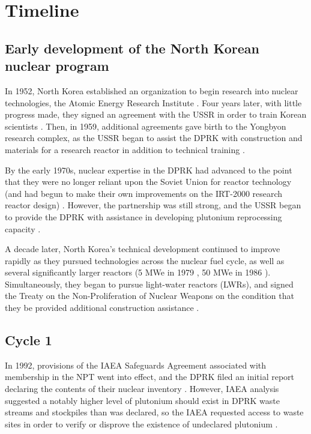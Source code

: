 \section{Timeline}
\subsection{Early development of the North Korean nuclear program}
In 1952, North Korea established an organization to begin research into nuclear technologies, the Atomic Energy Research Institute \cite{ntiAERI}. Four years later, with little progress made, they signed an agreement with the USSR in order to train Korean scientists \cite{nti15}. Then, in 1959, additional agreements gave birth to the Yongbyon research complex, as the USSR began to assist the DPRK with construction and materials for a research reactor in addition to technical training \cite{nti15}.

By the early 1970s, nuclear expertise in the DPRK had advanced to the point that they were no longer reliant upon the Soviet Union for reactor technology (and had begun to make their own improvements on the IRT-2000 research reactor design) \cite{nti15}. However, the partnership was still strong, and the USSR began to provide the DPRK with assistance in developing plutonium reprocessing capacity \cite{nti15}.

A decade later, North Korea's technical development continued to improve rapidly as they pursued technologies across the nuclear fuel cycle, as well as several significantly larger reactors (5 MWe in 1979 \cite{ntiYongbyon}, 50 MWe in 1986 \cite{ntiYongbyon2}). Simultaneously, they began to pursue light-water reactors (LWRs), and signed the Treaty on the Non-Proliferation of Nuclear Weapons on the condition that they be provided additional construction assistance \cite{nti15}.   

\subsection{Cycle 1}

In 1992, provisions of the IAEA Safeguards Agreement associated with membership in the NPT went into effect, and the DPRK filed an initial report declaring the contents of their nuclear inventory \cite{iaea92}. However, IAEA analysis suggested a notably higher level of plutonium should exist in DPRK waste streams and stockpiles than was declared, so the IAEA requested access to waste sites in order to verify or disprove the existence of undeclared plutonium \cite{iaea09}. 

